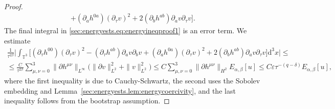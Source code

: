 \documentclass{article}
\newcommand{\TT}{\mathbb{T}}
\newcommand{\de}{\mathrm{d}}
\newcommand{\ve}{\varepsilon}
\newcommand{\pa}{\partial}
\begin{document}
\begin{proof}
\begin{multline}
        +(\pa_a h^{0a}) (\pa_\tau v)^2 + 2(\pa_b h^{ab}) \pa_a v\pa_\tau v\Big].
    \end{multline}
    The final integral in \eqref{sec:energyests.eq:energyineqproof1} is an error term. We estimate
    \begin{multline}\label{sec:energyests.eq:energyineqproof2}
        \frac{1}{\tau^{2\beta}}\Big|\int_{\TT^3}\Big[(\pa_\tau h^{00})(\pa_\tau v)^2 - (\pa_\tau h^{ab})\pa_a v \pa_b v +(\pa_a h^{0a}) (\pa_\tau v)^2 + 2(\pa_b h^{ab}) \pa_a v\pa_\tau v\Big]\de^3 x\Big|\leq\\
        \leq\frac{C}{\tau^{2\beta}}\sum_{\mu,\nu=0}^3\|\pa h^{\mu\nu}\|_{L^\infty}\Big(\|\pa v\|_{L^2}^2 + \|v\|_{L^2}^2\Big) \leq C\sum_{\mu,\nu=0}^3 \|\pa h^{\mu\nu}\|_{H^2} E_{\alpha,\beta}[u] \leq C\ve \tau^{-(q-\delta)}E_{\alpha,\beta}[u],
    \end{multline}
    where the first inequality is due to Cauchy-Schwartz, the second uses the Sobolev embedding and Lemma~\ref{sec:energyests.lem:energycoercivity}, and the last inequality follows from the bootstrap assumption.
    

\end{proof}
\end{document}
